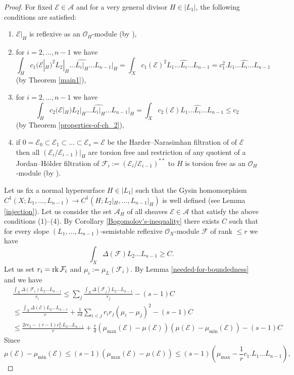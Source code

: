 \documentclass[12pt]{article}
\theoremstyle{plain}
\theoremstyle{definition}
\theoremstyle{remark}
\newcommand{\cA}{{\mathcal A}}
\newcommand{\cE}{{\mathcal E}}
\newcommand{\cF}{{\mathcal F}}
\newcommand{\cO}{{\mathcal O}}
\newcommand{\rk}{{\mathop{\rm rk \,}}}
\begin{document}
\begin{proof}
For fixed $\cE\in \cA$  and  for a very general divisor $H\in |L_1|$,
the following conditions are satisfied:
\begin{enumerate}
	\item $\cE|_{H}$ is reflexive as an $\cO_H$-module (by  \cite[Corollary 1.1.14]{HL}),
	\item for $i=2,...,n-1$ we have $$\int _H c_1 (\cE |_{H})^2 L_2|_H...\widehat{L_i|_H}...L_{n-1}|_H=\int _X c_1 (\cE )^2 L_1...\widehat{L_i}...L_{n-1}=c_1^2 .L_1...\widehat{L_i}...L_{n-1}$$
	(by Theorem \ref{main1}),
	\item for $i=2,...,n-1$ we have
	$$\int _H c_2 (\cE |_{H}) L_2|_H...\widehat{L_i|_H}...L_{n-1}|_H=\int _X c_2 (\cE ) L_1...\widehat{L_i}...L_{n-1}\le c_2$$
	(by Theorem \ref{properties-of-ch_2}),
	\item  if $0= \cE_0\subset \cE_1\subset ...\subset \cE_s=\cE$ be the Harder--Narasimhan filtration of 
	of $\cE$ then all  $(\cE_i/\cE _{i-1})|_H$ are torsion free and
	restriction of any quotient of a Jordan--H\"older filtration of $\cF_i:= (\cE_i/\cE _{i-1})^{**}$ to $H$ is torsion free  as an $\cO_H$-module (by  \cite[Corollary 1.1.14]{HL}).
\end{enumerate}
Let us fix a normal hypersurface $H\in |L_1|$ such that the Gysin homomorphism 
$C^1(X;L_1,...,L_{n-1})\to C^1(H;L_2|_H,...,L_{n-1}|_H)$ is well defined (see Lemma \ref{injection}). 
Let us consider the set $\cA _H$ of all sheaves $\cE\in \cA $  that satisfy the above conditions (1)--(4).
By Corollary \ref{Bogomolov's-inequality} there exists $C$ such that for every slope $(L_1,...,L_{n-1})$-semistable reflexive $\cO_X$-module $\cF$ of rank $\le r$ we have
	$$\int _X \Delta (\cF) L_2...L_{n-1}\ge C.$$
Let us set $r_i=\rk \cF_i$ and $\mu_i:= \mu _L(\cF_i)$. 
By	Lemma \ref{needed-for-boundedness} and \cite[Lemma 1.4]{La1} we have
\begin{align*}
& \frac{\int _X \Delta  (\cF_i)L_2...L_{n-1}}{r_i} \le \sum _j \frac{\int _X \Delta  (\cF_j)L_2...L_{n-1}}{r_j}-(s-1)C\\
 &\le 	\frac{\int _X \Delta  (\cE)L_2...L_{n-1}}{r}+	\frac{1}{rd}\sum _{i<j} r_ir_j\left(\mu_i -  \mu_j\right)^2-(s-1)C\\
&\le 	\frac{ 2r c_2-(r-1)c_{1}^2.L_2...L_{n-1}}{r}+	\frac{r}{d} \left(\mu_{\max}(\cE) -  \mu (\cE)\right) \left(\mu(\cE) -  \mu _{\min} (\cE)\right)-(s-1)C
\end{align*}
Since 
$$\mu(\cE) -  \mu _{\min} (\cE) \le (s-1) \left(\mu_{\max}(\cE) -  \mu (\cE)\right)\le (s-1) \left(\mu_{\max}-\frac{1}{r}c_{1}.L_1...L_{n-1}\right) ,$$

\end{proof}
\end{document}

